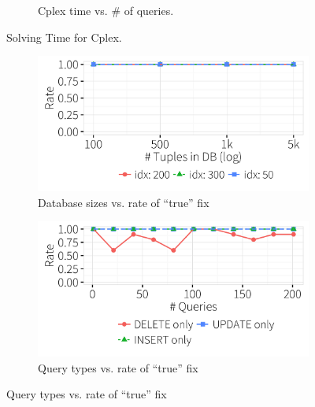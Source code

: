 \begin{figure}[t]
\begin{subfigure} [t]{.3\textwidth}
    \vspace*{-.25in}
    \caption{Cplex time vs. \# of queries.}
    \vspace*{-.1in}
    \label{f:heuristic_time} 
    \end{subfigure}
   \caption{Solving Time for Cplex. }
   \vspace*{-.1in}
   \label{f:soltime}
  \end{figure}

  \begin{figure}[ht]
  \centering
    \begin{subfigure} [t]{.3\textwidth}
    \includegraphics[width = .99\columnwidth]{figures/dbsize_acc_idx}
    \vspace*{-.25in}
    \caption{Database sizes vs. rate of ``true'' fix}
    \vspace*{-.1in}
    \label{f:heuristic_acc} 
    \end{subfigure}
    \begin{subfigure} [t]{.3\textwidth}
    \includegraphics[width = .99\columnwidth]{figures/indelup_acc_idx}
    \vspace*{-.25in}
    \caption{Query types vs. rate of ``true'' fix}
    \vspace*{-.1in}
    \label{f:heuristic_time} 
    \end{subfigure}

\end{figure}
